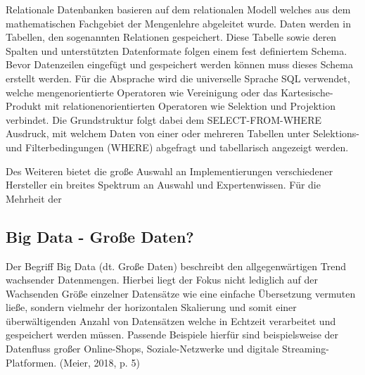


Relationale Datenbanken basieren auf dem relationalen Modell welches aus dem mathematischen Fachgebiet der Mengenlehre abgeleitet wurde. Daten werden in Tabellen, den sogenannten Relationen gespeichert. Diese Tabelle sowie deren Spalten und unterstützten Datenformate folgen einem fest definiertem Schema. Bevor Datenzeilen eingefügt und gespeichert werden können muss dieses Schema erstellt werden. Für die Absprache wird die universelle Sprache SQL verwendet, welche mengenorientierte Operatoren wie Vereinigung oder das Kartesische-Produkt mit relationenorientierten Operatoren wie Selektion und Projektion verbindet. Die Grundstruktur folgt dabei dem SELECT-FROM-WHERE Ausdruck, mit welchem Daten von einer oder mehreren Tabellen unter Selektions- und Filterbedingungen (WHERE) abgefragt und tabellarisch angezeigt werden. 


Des Weiteren bietet die große Auswahl an Implementierungen verschiedener Hersteller ein breites Spektrum an Auswahl und Expertenwissen. Für die Mehrheit der 

\subsection{Big Data - Große Daten?}

Der Begriff Big Data (dt. Große Daten) beschreibt den allgegenwärtigen Trend wachsender Datenmengen. Hierbei liegt der Fokus nicht lediglich auf der Wachsenden Größe einzelner Datensätze wie eine einfache Übersetzung vermuten ließe, sondern vielmehr der horizontalen Skalierung und somit einer überwältigenden Anzahl von Datensätzen welche in Echtzeit verarbeitet und gespeichert werden müssen. Passende Beispiele hierfür sind beispielsweise der Datenfluss großer Online-Shops, Soziale-Netzwerke und digitale Streaming-Platformen. (Meier, 2018, p. 5)